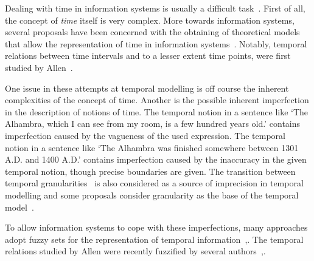 Dealing with time in information systems is usually a difficult task~\cite{Bolour82}.
First of all, the concept of \emph{time} itself is very complex. More towards information systems, several proposals have been concerned with the obtaining of theoretical models that allow the representation of time in information systems~\cite{Cru97}. Notably, temporal relations between time intervals and to a lesser extent time points, were first studied by Allen~\cite{Allen83}.


One issue in these attempts at temporal modelling is off course the inherent complexities of the concept of time. Another is the possible inherent imperfection in the description of notions of time. The temporal notion in a sentence like `The Alhambra, which I can see from my room, is a few hundred years old.' contains imperfection caused by the vagueness of the used expression. The temporal notion in a sentence like `The Alhambra was finished somewhere between 1301 A.D. and 1400 A.D.' contains imperfection caused by the inaccuracy in the given temporal notion, though precise boundaries are given. The transition between temporal granularities~\cite{Lin97} is also considered as a source of imprecision in temporal modelling and some proposals consider granularity as the base of the temporal model~\cite{Cru97}.


To allow information systems to cope with these imperfections, many approaches adopt fuzzy sets for the representation of temporal information~\cite{Billiet:Pons:Matthe:DeTre:Pons:2011:BipolarFuzzy},\cite{Dubois:jucs_9_9:fuzziness_and_uncertainty_in}. The temporal relations studied by Allen were recently fuzzified by several authors~\cite{ohlbach04},\cite{schockaert08}.


